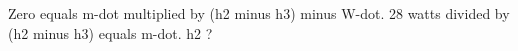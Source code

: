 Zero equals m-dot multiplied by (h2 minus h3) minus W-dot.  
28 watts divided by (h2 minus h3) equals m-dot.  
h2 ?
